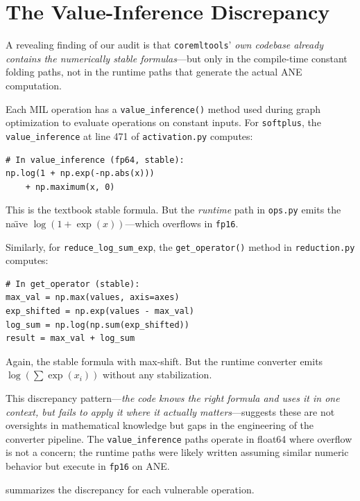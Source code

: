 \documentclass[10pt,twocolumn]{article}
\newcommand{\fp}{\texttt{fp16}}
\newcommand{\ane}{ANE}
\newcommand{\coremltools}{\texttt{coremltools}}
\begin{document}
\section{The Value-Inference Discrepancy}\nopagebreak
\label{sec:discrepancy}

A revealing finding of our audit is that \coremltools{}'
\emph{own codebase already contains the numerically stable
formulas}---but only in the compile-time constant folding paths,
not in the runtime paths that generate the actual \ane{} computation.

Each MIL operation has a \texttt{value\_inference()} method used
during graph optimization to evaluate operations on constant
inputs.  For \texttt{softplus}, the \texttt{value\_inference} at
line 471 of \texttt{activation.py} computes:

\begin{lstlisting}
# In value_inference (fp64, stable):
np.log(1 + np.exp(-np.abs(x)))
    + np.maximum(x, 0)
\end{lstlisting}

This is the textbook stable formula.  But the \emph{runtime} path
in \texttt{ops.py} emits the na\"{\i}ve
$\log(1 + \exp(x))$---which overflows in \fp{}.

Similarly, for \texttt{reduce\_log\_sum\_exp}, the \texttt{get\_operator()}
method in \texttt{reduction.py} computes:

\begin{lstlisting}
# In get_operator (stable):
max_val = np.max(values, axis=axes)
exp_shifted = np.exp(values - max_val)
log_sum = np.log(np.sum(exp_shifted))
result = max_val + log_sum
\end{lstlisting}

Again, the stable formula with max-shift.  But the runtime converter
emits $\log(\sum \exp(x_i))$ without any stabilization.

This discrepancy pattern---\emph{the code knows the right formula
and uses it in one context, but fails to apply it where it actually
matters}---suggests these are not oversights in mathematical
knowledge but gaps in the engineering of the converter pipeline.
The \texttt{value\_inference} paths operate in float64 where
overflow is not a concern; the runtime paths were likely written
assuming similar numeric behavior but execute in \fp{} on \ane{}.

 summarizes the discrepancy for each
vulnerable operation.
\end{document}
